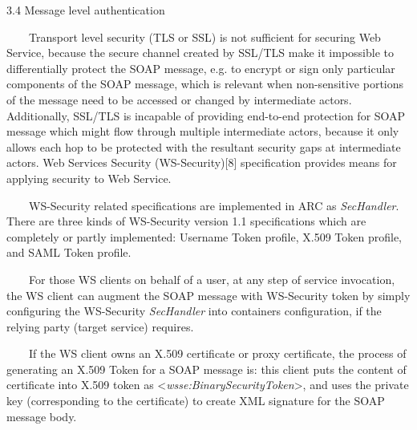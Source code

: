 \documentclass{article}
\begin{document}
3.4 Message level authentication

\ \ \ \ Transport level security (TLS or SSL) is not sufficient for
securing Web Service, because the secure channel created by SSL/TLS
make it impossible to differentially protect the SOAP message, e.g. to
encrypt or sign only particular components of the SOAP message, which
is relevant when non-sensitive portions of the message need to be
accessed or changed by intermediate actors. Additionally, SSL/TLS is
incapable of providing end-to-end protection for SOAP message which
might flow through multiple intermediate actors, because it only allows
each hop to be protected with the resultant security gaps at
intermediate actors. Web Services Security (WS-Security)[8]
specification provides means for applying security to Web Service.

\ \ \ \ WS-Security related specifications are implemented in ARC as
\textit{SecHandler}. There are three kinds of WS-Security version 1.1
specifications which are completely or partly implemented: Username
Token profile, X.509 Token profile, and SAML Token profile.

\ \ \ \ For those WS clients on behalf of a user, at any step of service
invocation, the WS client can augment the SOAP message with WS-Security
token by simply configuring the WS-Security \textit{SecHandler} into
container{\textquotesingle}s configuration, if the relying party
(target service) requires.

\ \ \ \ If the WS client owns an X.509 certificate or proxy certificate,
the process of generating an X.509 Token for a SOAP message is: this
client puts the content of certificate into X.509 token as
{\textless}\textit{wsse:BinarySecurityToken}{\textgreater}, and uses
the private key (corresponding to the certificate) to create XML
signature for the SOAP message body.
\end{document}
